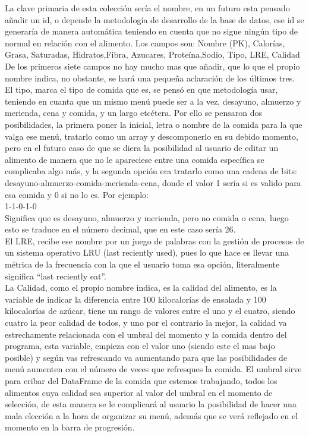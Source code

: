 La clave primaria de esta colección sería el nombre, en un futuro esta pensado añadir un id, o depende la metodología de desarrollo de la base de datos, ese id se generaría de manera automática teniendo en cuenta que no sigue ningún tipo de normal en relación con el alimento.
Los campos son:
Nombre (PK), Calorías, Grasa, Saturadas, Hidratos,Fibra, Azucares, Proteína,Sodio, Tipo, LRE, Calidad
De los primeros siete campos no hay mucho mas que añadir, que lo que el propio nombre indica, no obstante, se hará una pequeña aclaración de los últimos tres.\\

El tipo, marca el tipo de comida que es, se pensó en que metodología usar, teniendo en cuanta que un mismo menú puede ser a la vez, desayuno, almuerzo y merienda, cena y comida, y un largo etcétera. Por ello se pensaron dos posibilidades, la primera poner la inicial, letra o nombre de la comida para la que valga ese menú, tratarlo como un array y descomponerlo en su debido momento, pero en el futuro caso de que se diera la posibilidad al usuario de editar un alimento de manera que no le apareciese entre una comida específica se complicaba algo más, y la segunda opción era tratarlo como una cadena de bits: desayuno-almuerzo-comida-merienda-cena, donde el valor 1 sería si es valido para esa comida y 0 si no lo es. Por ejemplo:\\
1-1-0-1-0 \\

Significa que es desayuno, almuerzo y merienda, pero no comida o cena, luego esto se traduce en el número decimal, que en este caso sería 26.\\

El LRE, recibe ese nombre por un juego de palabras con la gestión de procesos de un sistema operativo LRU (last reciently used), pues lo que hace es llevar una métrica de la frecuencia con la que el usuario toma esa opción, literalmente significa “last reciently eat”. \\

La Calidad, como el propio nombre indica, es la calidad del alimento, es la variable de indicar la diferencia entre 100 kilocalorías de ensalada y 100 kilocalorías de azúcar, tiene un rango de valores entre el uno y el cuatro,  siendo cuatro la peor calidad de todos, y uno por el contrario la mejor, la calidad va estrechamente relacionada con el umbral del momento y la comida dentro del programa, esta variable, empieza con el valor uno (siendo este el mas bajo posible) y según vas refrescando va aumentando para que las posibilidades de menú aumenten con el número de veces que refresques la comida. El umbral sirve para cribar del DataFrame de la comida que estemos trabajando, todos los alimentos cuya calidad sea superior al valor del umbral en el momento de selección, de esta manera se le complicará al usuario la posibilidad de hacer una mala elección a la hora de organizar su menú, además que se verá reflejado en el momento en la barra de progresión.\\

